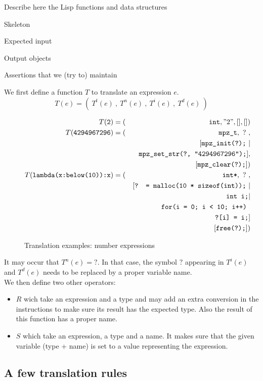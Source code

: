 \documentclass[12pt,a4paper]{article}
\newcommand{\cl}[1]{\texttt{#1}}
\begin{document}
Describe here the Lisp functions and data structures

Skeleton

Expected input

Output objects

Assertions that we (try to) maintain




We first define a function $T$ to translate an expression $e$.
$$ T(e) = ( \ T^t(e) \ , \ T^n(e) \ , \ T^i(e) \ , \ T^d(e) \ ) $$

\begin{figure}[!ht]
\begin{eqnarray*}
T(\cl{2}) &= (& \cl{int}, "2", [], []) \\
T(\cl{4294967296}) &= (& \cl{mpz\_t}, \ ? \ , \\
&& [ \cl{mpz\_init(?);} \ | \\
&& \ \cl{mpz\_set\_str(?, "4294967296");} ],\\
&& [ \cl{mpz\_clear(?);} ]) \\
T(\cl{lambda(x:below(10)):x}) &= (& \cl{int*}, \ ? \ , \\
&& [ \cl{? = malloc(10 * sizeof(int));} \ | \\
&& \ \cl{int i;} | \\
&& \ \cl{for(i = 0; i < 10; i++) }\\
&& \ \ \ \cl{?[i] = i;}  ]\\
&& [ \cl{free(?);} ])
\end{eqnarray*}
\caption{Translation examples: number expressions}
\end{figure}

It may occur that $T^n(e) = ?$. In that case, the symbol $?$ appearing in $T^i(e)$ and $T^d(e)$ needs to be replaced by a proper variable name.\\

We then define two other operators:
\begin{itemize}
\item $R$ wich take an expression and a type and may add an extra conversion in the instructions to make sure its result has the expected type. Also the result of this function has a proper name.
\item $S$ which take an expression, a type and a name. It makes sure that the given variable (type + name) is set to a value representing the expression.
\end{itemize}




\subsection{A few translation rules}
\end{document}
